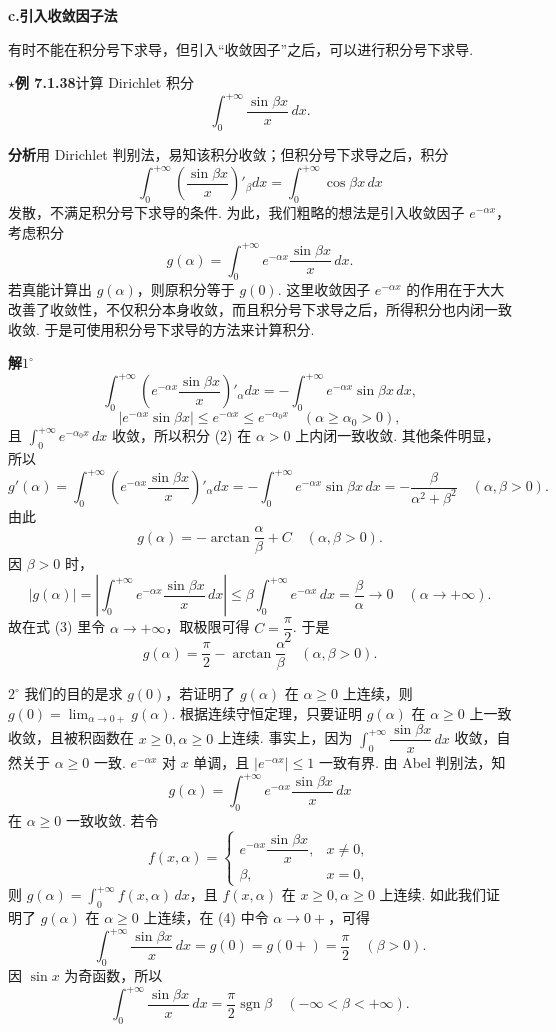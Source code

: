 \documentclass[UTF8, 12pt, fontset=fandol, oneside]{ctexart}
\begin{document}
\noindent\textbf{c.\quad 引入收敛因子法}

有时不能在积分号下求导，但引入“收敛因子”之后，可以进行积分号下求导.

\noindent\textbf{$\star$例 7.1.38}\quad 计算 Dirichlet 积分
\[
\int_0^{+\infty}\frac{\sin\beta x}{x}\,dx.
\]

\noindent\textbf{分析}\quad 用 Dirichlet 判别法，易知该积分收敛；但积分号下求导之后，积分
\[
\int_0^{+\infty}\left(\frac{\sin\beta x}{x}\right)'_\beta dx
=\int_0^{+\infty}\cos\beta x\,dx
\]
发散，不满足积分号下求导的条件. 为此，我们粗略的想法是引入收敛因子 $e^{-\alpha x}$，考虑积分
\[
g(\alpha)=\int_0^{+\infty}e^{-\alpha x}\frac{\sin\beta x}{x}\,dx.
\tag{1}
\]
若真能计算出 $g(\alpha)$，则原积分等于 $g(0)$. 这里收敛因子 $e^{-\alpha x}$ 的作用在于大大改善了收敛性，不仅积分本身收敛，而且积分号下求导之后，所得积分也内闭一致收敛. 于是可使用积分号下求导的方法来计算积分.

\noindent\textbf{解}\quad $1^\circ$
\[
\int_0^{+\infty}\left(e^{-\alpha x}\frac{\sin\beta x}{x}\right)'_\alpha dx
=-\int_0^{+\infty}e^{-\alpha x}\sin\beta x\,dx,
\tag{2}
\]
\[
|e^{-\alpha x}\sin\beta x|\le e^{-\alpha x}\le e^{-\alpha_0x}\quad(\alpha\ge\alpha_0>0),
\]
且 $\displaystyle\int_0^{+\infty}e^{-\alpha_0x}\,dx$ 收敛，所以积分 (2) 在 $\alpha>0$ 上内闭一致收敛. 其他条件明显，所以
\[
g'(\alpha)=\int_0^{+\infty}\left(e^{-\alpha x}\frac{\sin\beta x}{x}\right)'_\alpha dx
=-\int_0^{+\infty}e^{-\alpha x}\sin\beta x\,dx
=-\frac{\beta}{\alpha^2+\beta^2}\quad(\alpha,\beta>0).
\]
由此
\[
g(\alpha)=-\arctan\frac{\alpha}{\beta}+C\quad(\alpha,\beta>0).
\tag{3}
\]
因 $\beta>0$ 时，
\[
|g(\alpha)|=\left|\int_0^{+\infty}e^{-\alpha x}\frac{\sin\beta x}{x}\,dx\right|
\le\beta\int_0^{+\infty}e^{-\alpha x}\,dx=\frac{\beta}{\alpha}\to0\quad(\alpha\to+\infty).
\]
故在式 (3) 里令 $\alpha\to+\infty$，取极限可得 $C=\dfrac{\pi}{2}$. 于是
\[
g(\alpha)=\frac{\pi}{2}-\arctan\frac{\alpha}{\beta}\quad(\alpha,\beta>0).
\tag{4}
\]

$2^\circ$ 我们的目的是求 $g(0)$，若证明了 $g(\alpha)$ 在 $\alpha\ge0$ 上连续，则 $g(0)=\displaystyle\lim_{\alpha\to0+}g(\alpha)$. 根据连续守恒定理，只要证明 $g(\alpha)$ 在 $\alpha\ge0$ 上一致收敛，且被积函数在 $x\ge0,\alpha\ge0$ 上连续. 事实上，因为 $\displaystyle\int_0^{+\infty}\dfrac{\sin\beta x}{x}\,dx$ 收敛，自然关于 $\alpha\ge0$ 一致. $e^{-\alpha x}$ 对 $x$ 单调，且 $|e^{-\alpha x}|\le1$ 一致有界. 由 Abel 判别法，知
\[
g(\alpha)=\int_0^{+\infty}e^{-\alpha x}\frac{\sin\beta x}{x}\,dx
\]
在 $\alpha\ge0$ 一致收敛. 若令
\[
f(x,\alpha)=
\begin{cases}
e^{-\alpha x}\dfrac{\sin\beta x}{x}, & x\ne0,\\[0.6em]
\beta, & x=0,
\end{cases}
\]
则 $g(\alpha)=\displaystyle\int_0^{+\infty}f(x,\alpha)\,dx$，且 $f(x,\alpha)$ 在 $x\ge0,\alpha\ge0$ 上连续. 如此我们证明了 $g(\alpha)$ 在 $\alpha\ge0$ 上连续，在 (4) 中令 $\alpha\to0+$，可得
\[
\int_0^{+\infty}\frac{\sin\beta x}{x}\,dx
=g(0)=g(0+)=\frac{\pi}{2}\quad(\beta>0).
\]
因 $\sin x$ 为奇函数，所以
\[
\int_0^{+\infty}\frac{\sin\beta x}{x}\,dx
=\frac{\pi}{2}\operatorname{sgn}\beta\quad(-\infty<\beta<+\infty).
\]
\end{document}
